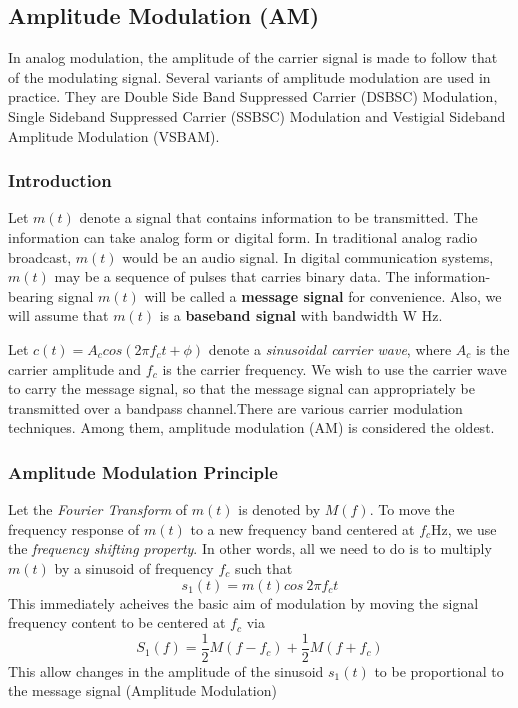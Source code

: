\subsection{Amplitude Modulation (AM)}
In analog modulation, the amplitude of the carrier signal is made to follow that of the modulating signal. Several variants of amplitude modulation are used in practice. They are Double Side Band Suppressed Carrier (DSBSC) Modulation, Single Sideband Suppressed Carrier (SSBSC) Modulation and Vestigial Sideband Amplitude Modulation (VSBAM).

\subsubsection{Introduction}
Let $m(t)$ denote a signal that contains information to be transmitted. The information can take analog form or digital form. In traditional analog radio broadcast, $m(t)$ would be an audio signal. In digital communication systems, $m(t)$ may be a sequence of pulses that carries binary data. The information-bearing signal $m(t)$ will be called a \textbf{message signal} for convenience. Also, we will assume that $m(t)$ is a \textbf{baseband signal} with bandwidth W Hz.

Let $ c(t) = A_c cos(2\pi f_c t + \phi)$ denote a \textit{sinusoidal carrier wave}, where $A_c$ is the carrier amplitude and $f_c$ is the carrier frequency. We wish to use the carrier wave to carry the message signal, so that the message signal can appropriately be transmitted over a bandpass channel.There are various carrier modulation techniques. Among them, amplitude modulation (AM) is considered the oldest.

\subsubsection{Amplitude Modulation Principle}
Let the \textit{Fourier Transform} of $m(t)$ is denoted by $M(f)$. To move the frequency response of $m(t)$ to a new frequency band centered at $f_c$Hz, we use the \textit{frequency shifting property}. In other words, all we need to do is to multiply $m(t)$ by a sinusoid of frequency $f_c$ such that
\begin{equation*}
    s_1 (t) = m(t)cos ~ 2\pi f_c t
\end{equation*}
This immediately acheives the basic aim of modulation by moving the signal frequency content to be centered at $f_c$ via
\begin{equation*}
  S_1 (f) =\frac{1}{2} M(f - f_c) + \frac{1}{2} M(f + f_c)
\end{equation*}
This allow changes in the amplitude of the sinusoid $s_1(t)$ to be proportional to the message signal (Amplitude Modulation)

